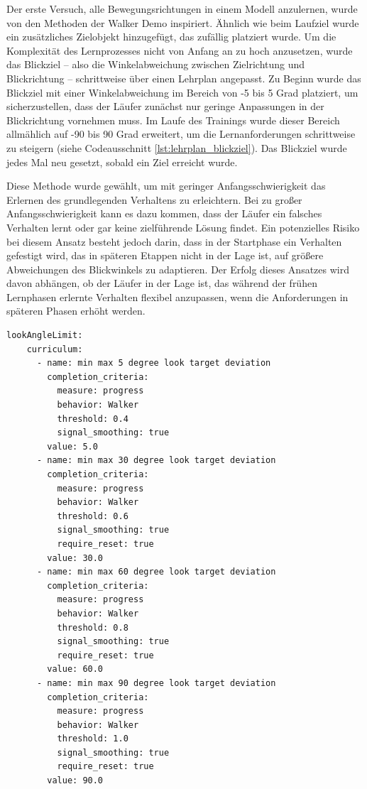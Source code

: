 Der erste Versuch, alle Bewegungsrichtungen in einem Modell anzulernen, wurde von den Methoden der Walker Demo inspiriert. Ähnlich wie beim Laufziel wurde ein zusätzliches Zielobjekt hinzugefügt, das zufällig platziert wurde. Um die Komplexität des Lernprozesses nicht von Anfang an zu hoch anzusetzen, wurde das Blickziel – also die Winkelabweichung zwischen Zielrichtung und Blickrichtung – schrittweise über einen Lehrplan angepasst. Zu Beginn wurde das Blickziel mit einer Winkelabweichung im Bereich von -5 bis 5 Grad platziert, um sicherzustellen, dass der Läufer zunächst nur geringe Anpassungen in der Blickrichtung vornehmen muss. Im Laufe des Trainings wurde dieser Bereich allmählich auf -90 bis 90 Grad erweitert, um die Lernanforderungen schrittweise zu steigern (siehe Codeausschnitt \ref{lst:lehrplan_blickziel}). Das Blickziel wurde jedes Mal neu gesetzt, sobald ein Ziel erreicht wurde.

Diese Methode wurde gewählt, um mit geringer Anfangsschwierigkeit das Erlernen des grundlegenden Verhaltens zu erleichtern. Bei zu großer Anfangsschwierigkeit kann es dazu kommen, dass der Läufer ein falsches Verhalten lernt oder gar keine zielführende Lösung findet. Ein potenzielles Risiko bei diesem Ansatz besteht jedoch darin, dass in der Startphase ein Verhalten gefestigt wird, das in späteren Etappen nicht in der Lage ist, auf größere Abweichungen des Blickwinkels zu adaptieren. Der Erfolg dieses Ansatzes wird davon abhängen, ob der Läufer in der Lage ist, das während der frühen Lernphasen erlernte Verhalten flexibel anzupassen, wenn die Anforderungen in späteren Phasen erhöht werden.

\begin{lstlisting}[caption={ Lehrplan für das Blickziel},captionpos=b,label={lst:lehrplan_blickziel}]
lookAngleLimit:
    curriculum:
      - name: min max 5 degree look target deviation
        completion_criteria:
          measure: progress
          behavior: Walker
          threshold: 0.4
          signal_smoothing: true
        value: 5.0
      - name: min max 30 degree look target deviation
        completion_criteria:
          measure: progress
          behavior: Walker
          threshold: 0.6
          signal_smoothing: true
          require_reset: true
        value: 30.0
      - name: min max 60 degree look target deviation
        completion_criteria:
          measure: progress
          behavior: Walker
          threshold: 0.8
          signal_smoothing: true
          require_reset: true
        value: 60.0
      - name: min max 90 degree look target deviation
        completion_criteria:
          measure: progress
          behavior: Walker
          threshold: 1.0
          signal_smoothing: true
          require_reset: true
        value: 90.0
\end{lstlisting}

